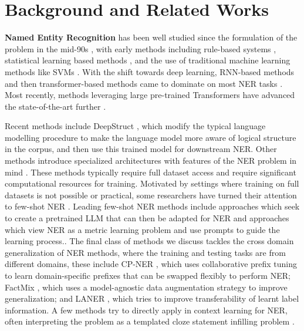 \documentclass[11pt]{article}
\begin{document}
\section{Background and Related Works}

\noindent\textbf{Named Entity Recognition} has been well studied
since the formulation of the problem in the mid-90s \citep{chinchor1995muc}, 
with early methods including rule-based systems \citep{eftimov2017rule, farmakiotou2000rule, mikheev1999named}, statistical learning based methods \citep{borthwick1998exploiting, borthwick1999maximum, zhou2002named},
and the use of traditional machine learning methods like SVMs \citep{makino2002tuning, mayfield2003named}. 
With the shift towards deep learning,
RNN-based methods and then transformer-based methods
came to dominate on most NER tasks \citep{de2015survey, huang2015bidirectional, limsopatham2016bidirectional}. 
Most recently, methods leveraging large pre-trained Transformers have advanced the state-of-the-art further \citep{lu2022unified, wang2022deepstruct, yu2020named, tong2022improving, lu2022punifiedner, li2022unified}. 

Recent methods include DeepStruct \citep{wang2022deepstruct},
which modify the typical language modelling procedure 
to make the language model more aware of logical structure in the corpus, 
and then use this trained model for downstream NER. 
Other methods introduce specialized architectures 
with features of the NER problem in mind \citep{yu2020named, li2022unified}.
These methods typically require full dataset access 
and require significant computational resources for training.
Motivated by settings where training on full datasets 
is not possible or practical, some researchers have 
turned their attention to few-shot NER
\citep{church2021emerging, das2022container, huang2022copner}.
Leading few-shot NER methods include approaches which seek to create a pretrained LLM that can then be adapted for NER \citep{wang2022deepstruct, xu2022clozing} and approaches which view NER as a metric learning problem and use prompts to guide the learning process.\citep{huang-etal-2022-copner, chen2022prompt}. The final class of methods we discuss 
tackles the cross domain generalization of NER methods, 
where the training and testing tasks are from different domains, 
these include CP-NER \citep{chen2023one},
which uses collaborative prefix tuning
to learn domain-specific prefixes that can be swapped flexibly to perform NER; 
FactMix \citep{yang2022factmix},
which uses a model-agnostic data augmentation strategy
to improve generalization;
and LANER \citep{hu2022label}, 
which tries to improve transferability of learnt label information.
A few methods try to directly apply in context learning \citep{wei2021finetuned} for NER, 
often interpreting the problem as 
a templated cloze statement infilling problem \citep{lee2021good, cui2021template}. 
\end{document}
